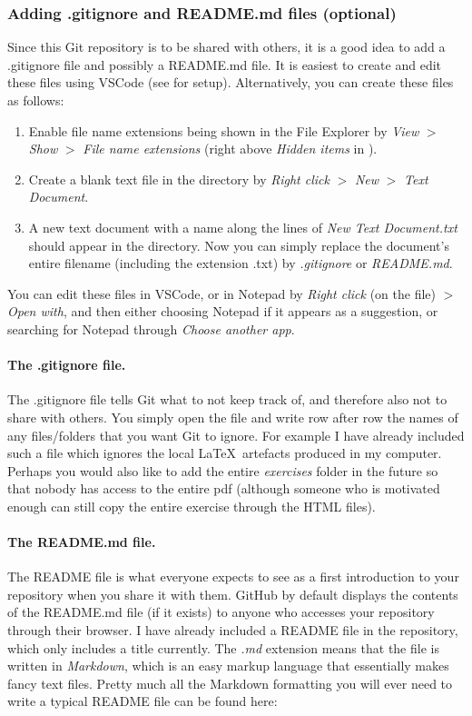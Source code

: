 \documentclass[a4paper,10pt]{article}
\begin{document}
\subsubsection{Adding .gitignore and README.md files (optional)}
\label{sec:gitignore}

Since this Git repository is to be shared with others, it is a good idea to add a .gitignore file and possibly a README.md file. It is easiest to create and edit these files using VSCode (see  for setup). Alternatively, you can create these files as follows:
\begin{enumerate}
    \item Enable file name extensions being shown in the File Explorer by \emph{View} $>$ \emph{Show} $>$ \emph{File name extensions} (right above \emph{Hidden items} in ).
    \item Create a blank text file in the directory by \emph{Right click} $>$ \emph{New} $>$ \emph{Text Document}.
    \item A new text document with a name along the lines of \emph{New Text Document.txt} should appear in the directory. Now you can simply replace the document's entire filename (including the extension .txt) by \emph{.gitignore} or \emph{README.md}.
\end{enumerate}
You can edit these files in VSCode, or in Notepad by \emph{Right click} (on the file) $>$ \emph{Open with}, and then either choosing Notepad if it appears as a suggestion, or searching for Notepad through \emph{Choose another app}.

\paragraph{The .gitignore file.} The .gitignore file tells Git what to not keep track of, and therefore also not to share with others. You simply open the file and write row after row the names of any files/folders that you want Git to ignore. For example I have already included such a file which ignores the local \LaTeX\ artefacts produced in my computer. Perhaps you would also like to add the entire \emph{exercises} folder in the future so that nobody has access to the entire pdf (although someone who is motivated enough can still copy the entire exercise through the HTML files).

\paragraph{The README.md file.} The README file is what everyone expects to see as a first introduction to your repository when you share it with them. GitHub by default displays the contents of the README.md file (if it exists) to anyone who accesses your repository through their browser. I have already included a README file in the repository, which only includes a title currently. The \emph{.md} extension means that the file is written in \emph{Markdown}, which is an easy markup language that essentially makes fancy text files. Pretty much all the Markdown formatting you will ever need to write a typical README file can be found here:
\end{document}

